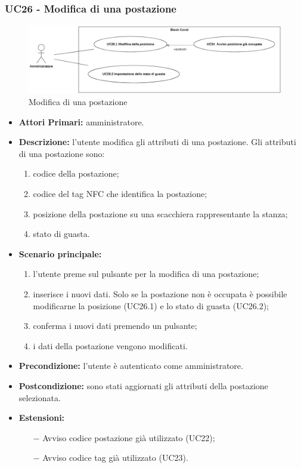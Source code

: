 \subsubsection{ UC26 - Modifica di una postazione}
\begin{figure}[H]
	\centering
	\includegraphics[width=18cm]{res/images/UC26-24.png}
	\caption{Modifica di una postazione}
\end{figure}
\begin{itemize}
	\item\textbf{Attori Primari:}
	amministratore.
	\item\textbf{Descrizione:}
	l'utente modifica gli attributi di una postazione.
	Gli attributi di una postazione sono:
	\begin{enumerate}
		\item codice della postazione;
		\item codice del tag NFC che identifica la postazione;
		\item posizione della postazione su una scacchiera rappresentante la stanza;
		\item stato di guasta.
	\end{enumerate}
	\item\textbf{Scenario principale:} 
	\begin{enumerate}
		\item l'utente preme sul pulsante per la modifica di una postazione;
		\item inserisce i nuovi dati. Solo se la postazione non è occupata è possibile modificarne la posizione (UC26.1) e lo stato di guasta (UC26.2);
		\item conferma i nuovi dati premendo un pulsante;
		\item i dati della postazione vengono modificati.
	\end{enumerate}
	\item\textbf{Precondizione:} 
	l'utente è autenticato come amministratore.
	\item\textbf{Postcondizione:}
	sono stati aggiornati gli attributi della postazione selezionata.
	\item\textbf{Estensioni:}
	\begin{itemize}
		\item[$-$] Avviso codice postazione già utilizzato (UC22);
		\item[$-$] Avviso codice tag già utilizzato (UC23).
	\end{itemize}
\end{itemize}

